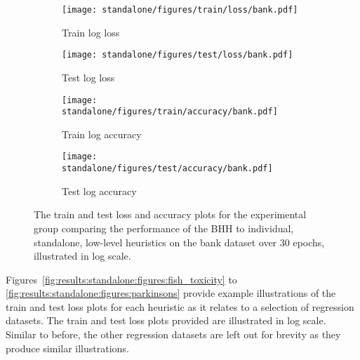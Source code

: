 \begin{figure}[htpb]
      \begin{subfigure}{0.5\textwidth}
            \centering
            \texttt{[image: standalone/figures/train/loss/bank.pdf]}
            \caption{Train log loss}
            \label{fig:results:standalone:figures:loss:train:bank}
      \end{subfigure}
      \begin{subfigure}{0.5\textwidth}
            \centering
            \texttt{[image: standalone/figures/test/loss/bank.pdf]}
            \caption{Test log loss}
            \label{fig:results:standalone:figures:loss:test:bank}
      \end{subfigure}
      \par\bigskip
      \par\bigskip
      \begin{subfigure}{0.5\textwidth}
            \centering
            \texttt{[image: standalone/figures/train/accuracy/bank.pdf]}
            \caption{Train log accuracy}
            \label{fig:results:standalone:figures:accuracy:train:bank}
      \end{subfigure}
      \begin{subfigure}{0.5\textwidth}
            \centering
            \texttt{[image: standalone/figures/test/accuracy/bank.pdf]}
            \caption{Test log accuracy}
            \label{fig:results:standalone:figures:accuracy:test:bank}
      \end{subfigure}
      \par\bigskip
      \caption{The train and test loss and accuracy plots for the experimental group comparing the performance of the \acs{BHH} to individual, standalone, low-level heuristics on the bank dataset over 30 epochs, illustrated in log scale.}
      \label{fig:results:standalone:figures:bank}
\end{figure}

Figures~\ref{fig:results:standalone:figures:fish_toxicity} to \ref{fig:results:standalone:figures:parkinsons} provide example illustrations of the train and test loss plots for each heuristic as it relates to a selection of regression datasets. The train and test loss plots provided are illustrated in log scale. Similar to before, the other regression datasets are left out for brevity as they produce similar illustrations.


